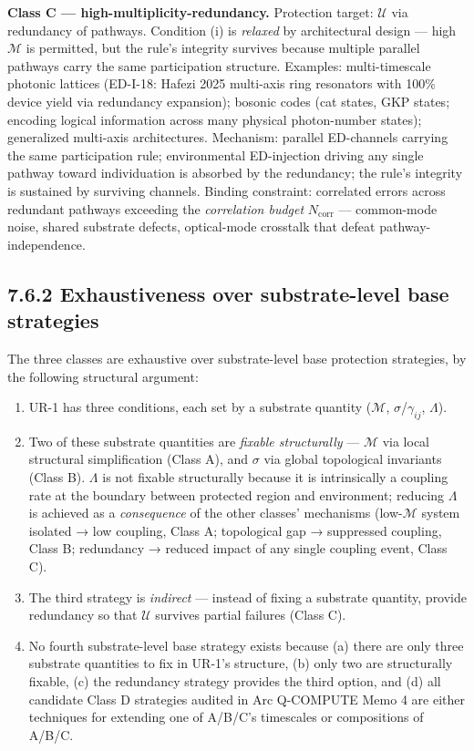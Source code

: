 \documentclass[11pt]{book}
\begin{document}
\textbf{Class C — high-multiplicity-redundancy.} Protection target: $\mathcal{U}$ via redundancy of pathways. Condition (i) is \textit{relaxed} by architectural design — high $\mathcal{M}$ is permitted, but the rule's integrity survives because multiple parallel pathways carry the same participation structure. Examples: multi-timescale photonic lattices (ED-I-18: Hafezi 2025 multi-axis ring resonators with 100\% device yield via redundancy expansion); bosonic codes (cat states, GKP states; encoding logical information across many physical photon-number states); generalized multi-axis architectures. Mechanism: parallel ED-channels carrying the same participation rule; environmental ED-injection driving any single pathway toward individuation is absorbed by the redundancy; the rule's integrity is sustained by surviving channels. Binding constraint: correlated errors across redundant pathways exceeding the \textit{correlation budget} $N_\mathrm{corr}$ — common-mode noise, shared substrate defects, optical-mode crosstalk that defeat pathway-independence.

\subsection{7.6.2 Exhaustiveness over substrate-level base strategies}

The three classes are exhaustive over substrate-level base protection strategies, by the following structural argument:

\begin{enumerate}
\item UR-1 has three conditions, each set by a substrate quantity ($\mathcal{M}$, $\sigma$/$\gamma_{ij}$, $\Lambda$).
\item Two of these substrate quantities are \textit{fixable structurally} — $\mathcal{M}$ via local structural simplification (Class A), and $\sigma$ via global topological invariants (Class B). $\Lambda$ is not fixable structurally because it is intrinsically a coupling rate at the boundary between protected region and environment; reducing $\Lambda$ is achieved as a \textit{consequence} of the other classes' mechanisms (low-$\mathcal{M}$ system isolated → low coupling, Class A; topological gap → suppressed coupling, Class B; redundancy → reduced impact of any single coupling event, Class C).
\item The third strategy is \textit{indirect} — instead of fixing a substrate quantity, provide redundancy so that $\mathcal{U}$ survives partial failures (Class C).
\item No fourth substrate-level base strategy exists because (a) there are only three substrate quantities to fix in UR-1's structure, (b) only two are structurally fixable, (c) the redundancy strategy provides the third option, and (d) all candidate Class D strategies audited in Arc Q-COMPUTE Memo 4 are either techniques for extending one of A/B/C's timescales or compositions of A/B/C.
\end{enumerate}
\end{document}
